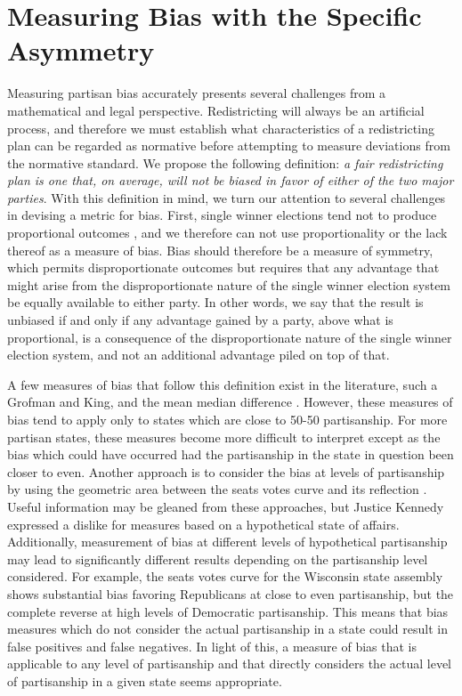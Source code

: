 \documentclass[preprint,12pt]{article}
\begin{document}
\section{Measuring Bias with the Specific Asymmetry\label{sec:MB}}

Measuring partisan bias accurately presents several challenges from a mathematical and legal perspective.
Redistricting will always be an artificial process, and therefore we must establish what characteristics of a redistricting plan can be regarded as normative before attempting to measure deviations from the normative standard.
We propose the following definition: \emph{a fair redistricting plan is one that, on average, will not be biased in favor of either of the two major parties}.
With this definition in mind, we turn our attention to several challenges in devising a metric for bias.
First, single winner elections tend not to produce proportional outcomes \cite{Kendall_1950_10.2307/588113}, and we therefore can not use proportionality or the lack thereof as a measure of bias.
Bias should therefore be a measure of symmetry, which permits disproportionate outcomes but requires that any advantage that might arise from the disproportionate nature of the single winner election system be equally available to either party.
In other words, we say that the result is unbiased if and only if any advantage gained by a party, above what is proportional, is a consequence of the disproportionate nature of the single winner election system, and not an additional advantage piled on top of that.

A few measures of bias that follow this definition exist in the literature, such a Grofman and King, and the mean median difference \cite{Grofman_2008_,Wang__,Wang_2016_10.1089/elj.2016.0387}.
However, these measures of bias tend to apply only to states which are close to 50-50 partisanship.
For more partisan states, these measures become more difficult to interpret except as the bias which could have occurred had the partisanship in the state in question been closer to even.
Another approach is to consider the bias at levels of partisanship by using the geometric area between the seats votes curve and its reflection \cite{Nagle_2015_10.1089/elj.2015.0311}.
Useful information may be gleaned from these approaches, but Justice Kennedy expressed a dislike for measures based on a hypothetical state of affairs.
Additionally, measurement of bias at different levels of hypothetical partisanship may lead to significantly different results depending on the partisanship level considered.
For example, the seats votes curve for the Wisconsin state assembly shows substantial bias favoring Republicans at close to even partisanship, but the complete reverse at high levels of Democratic partisanship.
This means that bias measures which do not consider the actual partisanship in a state could result in false positives and false negatives.
In light of this, a measure of bias that is applicable to any level of partisanship and that directly considers the actual level of partisanship in a given state seems appropriate.
\end{document}
